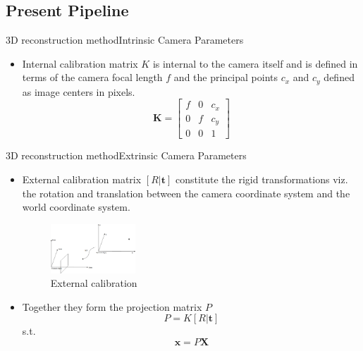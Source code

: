 \documentclass{beamer}
\begin{document}
\subsection{Present Pipeline}

\begin{frame}{3D reconstruction method}{Intrinsic Camera Parameters}
  \begin{itemize} 
    \item Internal calibration matrix  $K$ is internal to the camera itself and is defined in terms of the  camera focal length $f$ and the principal points $c_x$ and  $c_y$ defined as image centers in pixels.
  \begin{equation}
   \mathbf{K}  = 
    \begin{bmatrix}
    f & 0 & c_x \\ 0 & f & c_y \\
    0 & 0 & 1 
    \end{bmatrix}
  \end{equation}
  \end{itemize}
\end{frame}

\begin{frame}{3D reconstruction method}{Extrinsic Camera Parameters}
 \begin{itemize}
  \item External calibration matrix $[R|\textbf{t}]$ constitute the rigid transformations viz. the rotation and translation between the camera coordinate system and the world coordinate system.
  \begin{figure}
    \centering
    \includegraphics[width=0.3\textwidth]{CameraWorld.png}
    \caption{External calibration}
  \end{figure}
  \item Together they form the projection matrix $P$
  \begin{equation*}
    P = K[R|\textbf{t}]
    \end{equation*}
    s.t. \begin{equation*} \mathbf{x} = P\mathbf{X} \end{equation*}
  \end{itemize}
\end{frame}
\end{document}

